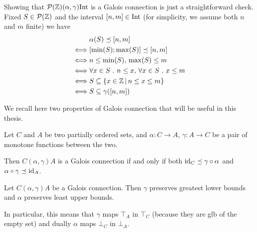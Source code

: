 \begin{example}[Intervals]
	Showing that $\mathcal{P}(\mathbb{Z}) (\alpha, \gamma) \text{Int}$ is a Galois connection is just a straightforward check. Fixed $S \in \mathcal{P}(\mathbb{Z})$ and the interval $[n, m] \in \text{Int}$ (for simplicity, we assume both $n$ and $m$ finite) we have
	\begin{align*}
		& \alpha(S) \preceq [n, m] \\
		\iff &[\min(S); \max(S)] \preceq [n, m] \\
		\iff &n \le \min(S),\, \max(S) \le m \\
		\iff &\forall x \in S\ .\ n \le x,\, \forall x \in S\ .\ x \le m \\
		\iff &S \subseteq \{ x \in \mathbb{Z} \,\vert\, n \le x \le m \} \\
		\iff &S \subseteq \gamma([n, m])
	\end{align*}
\end{example}

We recall here two properties of Galois connection that will be useful in this thesis.

\begin{prop}\label{ch2:th:gc-extensive-charact}
	Let $C$ and $A$ be two partially ordered sets, and $\alpha : C \rightarrow A$, $\gamma : A \rightarrow C$ be a pair of monotone functions between the two.
	
	Then $C (\alpha, \gamma) A$ is a Galois connection if and only if both $\text{id}_C \preceq \gamma \circ \alpha$ and $\alpha \circ \gamma \preceq \text{id}_A$.
\end{prop}
\begin{prop}\label{ch2:th:gc-adjoints-preserve-glb-lub}
	Let $C (\alpha, \gamma) A$ be a Galois connection. Then $\gamma$ preserves greatest lower bounds and $\alpha$ preserves least upper bounds.
\end{prop}
In particular, this means that $\gamma$ maps $\top_A$ in $\top_C$ (because they are glb of the empty set) and dually $\alpha$ maps $\bot_C$ in $\bot_A$.

